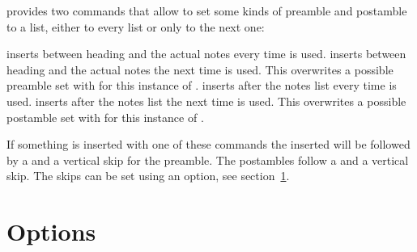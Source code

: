 \documentclass[toc=bib,toc=index]{cnpkgdoc}
\begin{document}
\enotez provides two commands that allow to set some kinds of preamble and
postamble to a list, either to every list or only to the next one:
\begin{beschreibung}
  \newline{}%
    inserts  between heading and the actual notes every time
     is used.
  \newline{}%
    inserts  between heading and the actual notes the next time
     is used.  This overwrites a possible preamble set with
     for this instance of .
  \newline{}%
    inserts  after the notes list every time 
    is used.
  \newline{}%
    inserts  after the notes list the next time
     is used.  This overwrites a possible postamble set
    with  for this instance of
    .
\end{beschreibung}
If something is inserted with one of these commands the inserted 
will be followed by a  and a vertical skip for the preamble.  The
postambles follow a  and a vertical skip.  The skips can be set using
an option, see section~\ref{sec:options}.


\section{Options}\label{sec:options}
\end{document}
